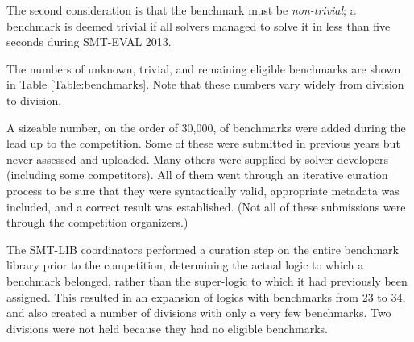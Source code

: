 \documentclass[twoside,11pt]{article}
\begin{document}
The second consideration is that the benchmark must be \emph{non-trivial}; a benchmark is deemed trivial if all solvers managed to solve it in less than five seconds during SMT-EVAL 2013.

The numbers of unknown, trivial, and remaining eligible benchmarks are shown in Table \ref{Table:benchmarks}. Note that these numbers vary widely from division to division.

A sizeable number, on the order of 30,000, of benchmarks were added during the lead up to the competition. Some of these were submitted in previous years but never assessed and uploaded. Many others were supplied by solver developers (including some competitors). All of them went through an iterative curation process to be sure that they were syntactically valid, appropriate metadata was included, and a correct result was established. (Not all of these submissions were through the competition organizers.)

The SMT-LIB coordinators performed a curation step on the entire benchmark library prior to the competition, determining the actual logic to which a benchmark belonged, rather than the super-logic to which it had previously been assigned. This resulted in an expansion of logics with benchmarks from 23 to 34, and also created a number of divisions with only a very few benchmarks. Two divisions were not held because they had no eligible benchmarks.
\end{document}
